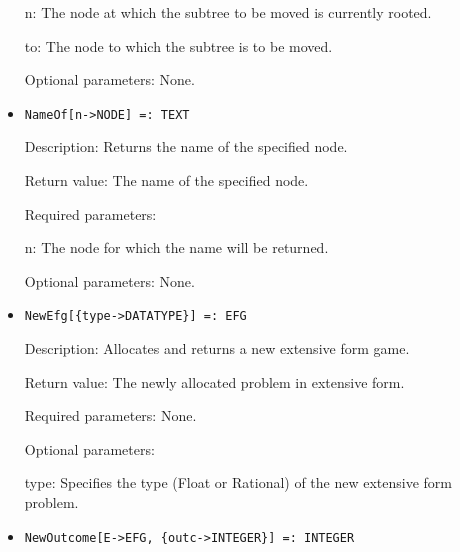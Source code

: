 \begin{itemize}
\bd
\item
[n:] The node at which the subtree to be moved is currently rooted.
\item
[to:] The node to which the subtree is to be moved.
\ed

\item
[Optional parameters:] None.
\ed

\item
\protect \large \begin{verbatim}
NameOf[n->NODE] =: TEXT
\end{verbatim}\normalsize

\bd
\item
[Description:] Returns the name of the specified node.
\item
[Return value:] The name of the specified node.
\item
[Required parameters:]\hfil\null

\bd
\item
[n:] The node for which the name will be returned.
\ed

\item
[Optional parameters:] None.
\ed

\item
\protect \large \begin{verbatim}
NewEfg[{type->DATATYPE}] =: EFG
\end{verbatim}\normalsize

\bd
\item
[Description:] Allocates and returns a new extensive form game.
\item
[Return value:] The newly allocated problem in extensive form.
\item
[Required parameters:] None.
\item
[Optional parameters:]\hfil\null

\bd
\item
[type:] Specifies the type (Float or Rational) of the new extensive
form problem.
\ed
\ed

\item
\protect \large \begin{verbatim}
NewOutcome[E->EFG, {outc->INTEGER}] =: INTEGER
\end{verbatim}\normalsize


\end{itemize}
